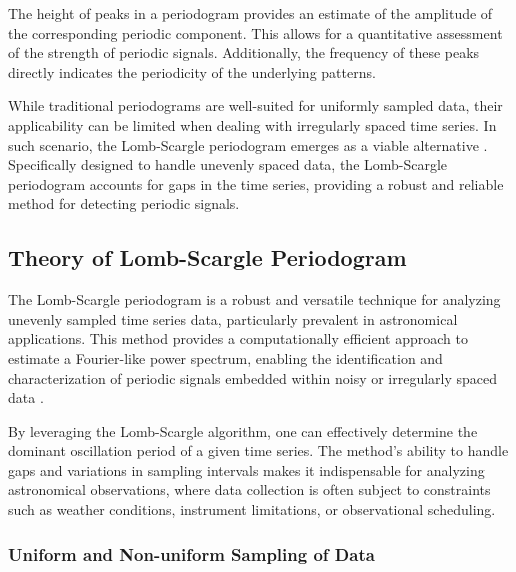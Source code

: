     		The height of peaks in a periodogram provides an estimate of the amplitude of the corresponding periodic component. This allows for a quantitative assessment of the strength of periodic signals. Additionally, the frequency of these peaks directly indicates the periodicity of the underlying patterns.
    		
    		While traditional periodograms are well-suited for uniformly sampled data, their applicability can be limited when dealing with irregularly spaced time series. In such scenario, the Lomb-Scargle periodogram emerges as a viable alternative \cite{lomb1976least,scargle1982studies}. Specifically designed to handle unevenly spaced data, the Lomb-Scargle periodogram accounts for gaps in the time series, providing a robust and reliable method for detecting periodic signals.
    		
    	\subsection{Theory of Lomb-Scargle Periodogram}
    		The Lomb-Scargle periodogram is a robust and versatile technique for analyzing unevenly sampled time series data, particularly prevalent in astronomical applications. This method provides a computationally efficient approach to estimate a Fourier-like power spectrum, enabling the identification and characterization of periodic signals embedded within noisy or irregularly spaced data \cite{vanderplas2018understanding}.
    		
    		By leveraging the Lomb-Scargle algorithm, one can effectively determine the dominant oscillation period of a given time series. The method's ability to handle gaps and variations in sampling intervals makes it indispensable for analyzing astronomical observations, where data collection is often subject to constraints such as weather conditions, instrument limitations, or observational scheduling.
    	
    		\subsubsection{Uniform and Non-uniform Sampling of Data}
